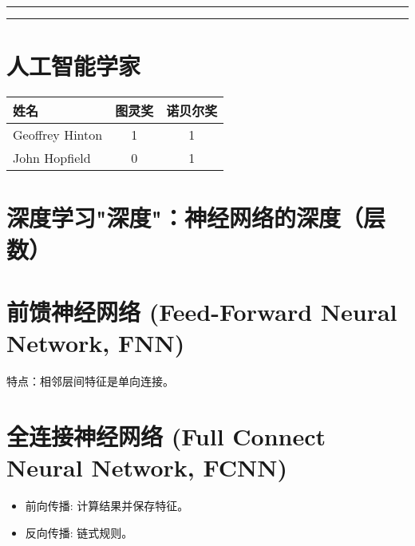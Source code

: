 \documentclass[
12pt, %
a4paper, 
oneside, %
headinclude,footinclude, %
]{scrartcl}
\title{\normalfont\spacedallcaps{深度学习}}
\date{}
\begin{document}
\maketitle
\newpage
\hypertarget{toc}{}
\begingroup
\begin{multicols}{2}
\tableofcontents
\end{multicols}
\endgroup
\newpage
\begingroup
\begin{multicols}{2}
\listoffigures
\end{multicols}
\endgroup
\hrule
\begingroup
\begin{multicols}{2}
\listoftables
\end{multicols}
\endgroup
\hrule
\begingroup
\begin{multicols}{2}
\listoftips
\end{multicols}
\endgroup
\newpage
\section{人工智能学家}
\begin{table}[h]
\centering
\begin{tabular}{|l|c|c|}
\hline
姓名 & 图灵奖 & 诺贝尔奖 \\
\hline
Geoffrey Hinton & 1 & 1 \\
\hline
John Hopfield & 0 & 1 \\
\hline
\end{tabular}
\end{table}

\section{深度学习"深度"：神经网络的深度（层数）}

\section{前馈神经网络 (Feed-Forward Neural Network, FNN)}
特点：相邻层间特征是单向连接。

\section{全连接神经网络 (Full Connect Neural Network, FCNN)}
\begin{itemize}
\item 前向传播: 计算结果并保存特征。
\item 反向传播: 链式规则。
\end{itemize}
\end{document}

